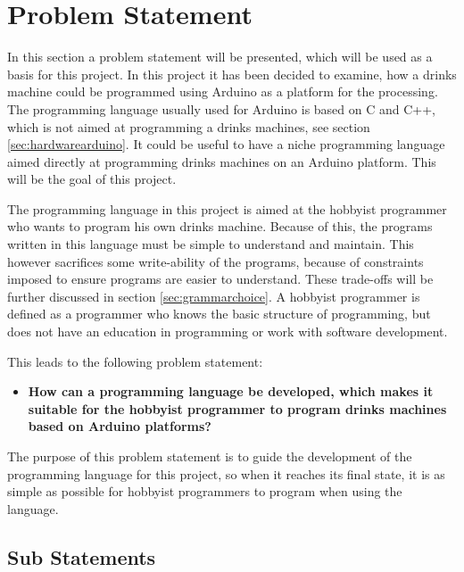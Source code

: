 \section{Problem Statement}
\label{sec:problemstatement}
In this section a problem statement will be presented, which will be used as a basis for this project. In this project it has been decided to examine, how a drinks machine could be programmed using Arduino as a platform for the processing. The programming language usually used for Arduino is based on C and C++, which is not aimed at programming a drinks machines, see section \ref{sec:hardwarearduino}. It could be useful to have a niche programming language aimed directly at programming drinks machines on an Arduino platform. This will be the goal of this project.

The programming language in this project is aimed at the hobbyist programmer who wants to program his own drinks machine. Because of this, the programs written in this language must be simple to understand and maintain. This however sacrifices some write-ability of the programs, because of constraints imposed to ensure programs are easier to understand. These trade-offs will be further discussed in section \ref{sec:grammarchoice}. A hobbyist programmer is defined as a programmer who knows the basic structure of programming, but does not have an education in programming or work with software development.

This leads to the following problem statement:
\begin{itemize}
	\item \textbf{How can a programming language be developed, which makes it suitable for the hobbyist programmer to program drinks machines based on Arduino platforms?}
\end{itemize}
The purpose of this problem statement is to guide the development of the programming language for this project, so when it reaches its final state, it is as simple as possible for hobbyist programmers to program when using the language. 

\subsection{Sub Statements}

